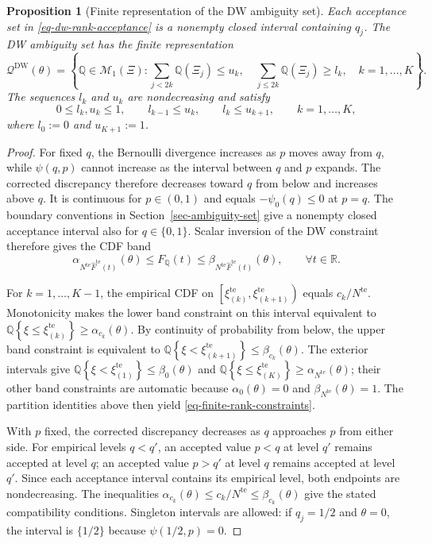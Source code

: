\documentclass[review,11pt,3p,authoryear,nopreprintline]{elsarticle}
\newtheorem{proposition}{Proposition}
\begin{document}
\begin{proposition}[Finite representation of the DW ambiguity set]
  \label{prop-finite-rank-constraints}
  Each acceptance set in \eqref{eq-dw-rank-acceptance} is a nonempty closed interval containing $q_j$. The DW ambiguity set has the finite representation
  \begin{equation}
    \mathcal Q^{\mathrm{DW}}(\theta)
    =\left\{\mathbb Q\in\mathcal M_1(\Xi):
      \sum_{j<2k}\mathbb Q(\Xi_j)\le u_k,\quad
      \sum_{j\le2k}\mathbb Q(\Xi_j)\ge l_k,\quad k=1,\ldots,K\right\}.
    \label{eq-finite-rank-constraints}
  \end{equation}
  The sequences $l_k$ and $u_k$ are nondecreasing and satisfy
  \[
    0\le l_k,u_k\le1,\qquad l_{k-1}\le u_k,\qquad l_k\le u_{k+1},
    \qquad k=1,\ldots,K,
  \]
  where $l_0:=0$ and $u_{K+1}:=1$.
\end{proposition}
\begin{proof}
  For fixed $q$, the Bernoulli divergence increases as $p$ moves away from $q$, while $\psi(q,p)$ cannot increase as the interval between $q$ and $p$ expands. The corrected discrepancy therefore decreases toward $q$ from below and increases above $q$. It is continuous for $p\in(0,1)$ and equals $-\psi_0(q)\le0$ at $p=q$. The boundary conventions in Section~\ref{sec-ambiguity-set} give a nonempty closed acceptance interval also for $q\in\{0,1\}$. Scalar inversion of the DW constraint therefore gives the CDF band \citep[Supplement, Section~S.6]{L.J23}
  \[
    \alpha_{N^{\mathrm{te}}\widehat F^{\mathrm{te}}(t)}(\theta)
      \le F_{\mathbb Q}(t)
      \le\beta_{N^{\mathrm{te}}\widehat F^{\mathrm{te}}(t)}(\theta),
    \qquad\forall t\in\mathbb R.
  \]

  For $k=1,\ldots,K-1$, the empirical CDF on $\left[\xi_{(k)}^{\mathrm{te}},\xi_{(k+1)}^{\mathrm{te}}\right)$ equals $c_k/N^{\mathrm{te}}$. Monotonicity makes the lower band constraint on this interval equivalent to $\mathbb Q\left\{\xi\le\xi_{(k)}^{\mathrm{te}}\right\}\ge\alpha_{c_k}(\theta)$. By continuity of probability from below, the upper band constraint is equivalent to $\mathbb Q\left\{\xi<\xi_{(k+1)}^{\mathrm{te}}\right\}\le\beta_{c_k}(\theta)$. The exterior intervals give $\mathbb Q\left\{\xi<\xi_{(1)}^{\mathrm{te}}\right\}\le\beta_0(\theta)$ and $\mathbb Q\left\{\xi\le\xi_{(K)}^{\mathrm{te}}\right\}\ge\alpha_{N^{\mathrm{te}}}(\theta)$; their other band constraints are automatic because $\alpha_0(\theta)=0$ and $\beta_{N^{\mathrm{te}}}(\theta)=1$. The partition identities above then yield \eqref{eq-finite-rank-constraints}.

  With $p$ fixed, the corrected discrepancy decreases as $q$ approaches $p$ from either side. For empirical levels $q<q'$, an accepted value $p<q$ at level $q'$ remains accepted at level $q$; an accepted value $p>q'$ at level $q$ remains accepted at level $q'$. Since each acceptance interval contains its empirical level, both endpoints are nondecreasing. The inequalities $\alpha_{c_k}(\theta)\le c_k/N^{\mathrm{te}}\le\beta_{c_k}(\theta)$ give the stated compatibility conditions. Singleton intervals are allowed: if $q_j=1/2$ and $\theta=0$, the interval is $\{1/2\}$ because $\psi(1/2,p)=0$.
\end{proof}
\end{document}
